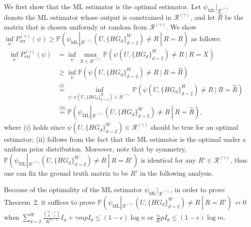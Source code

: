 \documentclass{article}
\newcommand\HG{\{ HG_d \}_{d=2}^W}
\begin{document}
We first show that the ML estimator is the optimal estimator. Let $\psi_{\text{ML}}|_{\mathcal{R}^{(\gamma)}}$ denote the ML estimator whose output is constrained in $\mathcal{R}^{(\gamma)}$, and let $\widehat{R}$ be the matrix that is chosen uniformly at random from $\mathcal{R}^{(\gamma)}$. We show $ \inf \limits_{\psi} P_{\text{err}}^{(\gamma)}(\psi) \geq \mathbb{P} ( \psi_{\text{ML}}|_{\mathcal{R}^{(\gamma)}} (U, \{ HG_d \}_{d=2}^W) \neq R \ | \ R = \widehat{R} ) $ as follows:
\begin{equation}\label{26}
	\begin{aligned}
		\inf \limits_{\psi} P_{\text{err}}^{(\gamma)}(\psi) &= \inf \limits_{\psi} \max \limits_{X \in \mathcal{R}^{(\gamma)}} \mathbb{P} ( \psi (U, \{ HG_d \}_{d=2}^W) \neq R \ | \ R=X) \\
		& \geq \inf \limits_{\psi} \mathbb{P} ( \psi (U, \{ HG_d \}_{d=2}^W) \neq R \ | \ R=\widehat{R}) \\
		& \overset{\text{(i)}}{=}  \inf \limits_{ \psi: \psi (U, \{ HG_d \}_{d=2}^W) \in \mathcal{R}^{(\gamma)} } \mathbb{P} ( \psi  (U, \{ HG_d \}_{d=2}^W) \neq R \ | \ R=\widehat{R}  )  \\
		& \overset{\text{(ii)}}{=} \mathbb{P} ( \psi_\text{ML}|_{\mathcal{R}^{(\gamma)}} (U, \{ HG_d \}_{d=2}^W) \neq R \ | \ R =\widehat{R}),
	\end{aligned}
\end{equation}
where (i) holds since $\psi (U, \{ HG_d \}_{d=2}^W) \in \mathcal{R}^{(\gamma)} $ should be true for an optimal estimator; (ii) follows from the fact that the ML estimator is the optimal under a uniform prior distribution. Moreover, note that by symmetry, $ \mathbb{P} ( \psi_\text{ML}|_{\mathcal{R}^{(\gamma)}} (U, \{ HG_d \}_{d=2}^W) \neq R \ | \ R =R')$ is identical for any $R' \in \mathcal{R}^{(\gamma)}$, thus one can fix the ground truth matrix to be $R'$ in the following analysis.

Because of the optimality of the ML estimator $\psi_{\text{ML}}|_{\mathcal{R}^{(\gamma)}}$, in order to prove Theorem~2, it suffices to prove $\mathbb{P} ( \psi_\text{ML}|_{\mathcal{R}^{(\gamma)}} (U, \HG) \neq R \ | \ R = R' ) \nrightarrow 0 $ when $ \sum_{d=2}^{W} \frac{\binom{n-1}{d-1}}{K^{d-1}} I_d + \gamma m p I_\theta \leq (1-\epsilon) \log n$ or $\frac{n}{K} p I_\theta \leq (1-\epsilon) \log m$.
\end{document}
